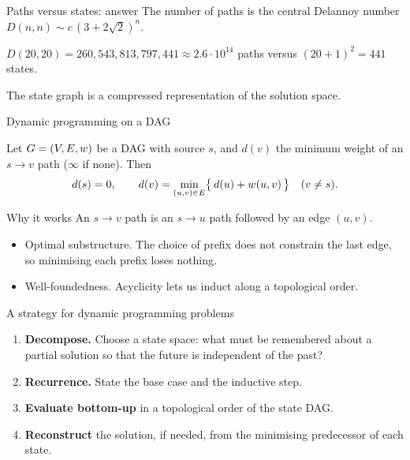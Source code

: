 \begin{frame}{Paths versus states: answer}
	The number of paths is the central Delannoy number $D(n,n)\sim c\,(3+2\sqrt2)^n$.
	\begin{center}
		$D(20,20) = 260{,}543{,}813{,}797{,}441 \approx 2.6\cdot 10^{14}$ paths
		\quad versus \quad $(20+1)^2=441$ states.
	\end{center}
	The state graph is a \alert{compressed representation} of the solution space.
\end{frame}

\begin{frame}{Dynamic programming on a DAG}
	\begin{theorem}
		Let $G=(V,E,w)$ be a DAG with source $s$, and $d(v)$ the minimum weight of an
		$s\to v$ path ($\infty$ if none). Then
		\[
			d(s)=0, \qquad d(v)=\min_{(u,v)\in E}\bigl\{\,d(u)+w(u,v)\,\bigr\}\quad (v\neq s).
		\]
	\end{theorem}
\end{frame}

\begin{frame}{Why it works}
	An $s\to v$ path is an $s\to u$ path followed by an edge $(u,v)$.
	\begin{itemize}
		\item \alert{Optimal substructure.} The choice of prefix does not constrain the last edge,
		so minimising each prefix loses nothing.
		\item \alert{Well-foundedness.} Acyclicity lets us induct along a topological order.
	\end{itemize}
\end{frame}

\begin{frame}{A strategy for dynamic programming problems}
	\begin{enumerate}
		\item \textbf{Decompose.} Choose a state space: what must be remembered about a
		partial solution so that the future is independent of the past?
		\item \textbf{Recurrence.} State the \alert{base case} and the \alert{inductive step}.
		\item \textbf{Evaluate bottom-up} in a topological order of the state DAG.
		\item \textbf{Reconstruct} the solution, if needed, from the minimising predecessor of each state.
	\end{enumerate}
\end{frame}

